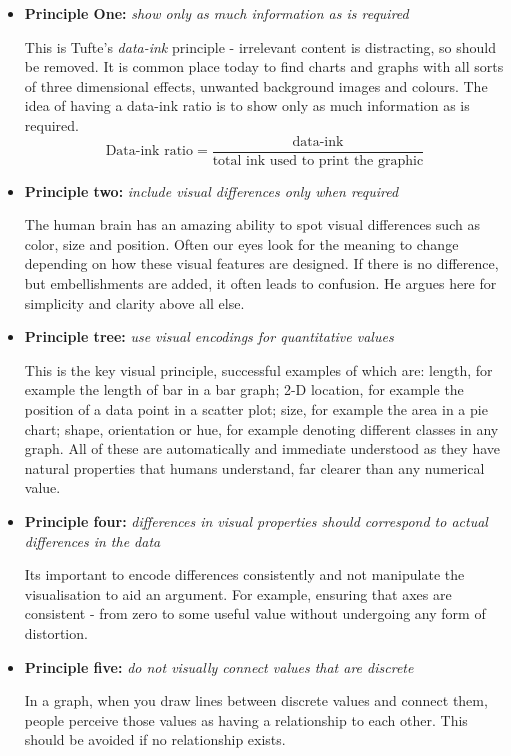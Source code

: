\documentclass[a4paper,11pt,titlepage]{article}
\begin{document}
		\par
	\begin{itemize}
		\item \textbf{Principle One:}
		\textit{show only as much information as is required}
		\par 
		This is Tufte's \textit{data-ink} principle - irrelevant content is distracting, so should be removed. It is common place today to find charts and graphs with all sorts of three dimensional effects, unwanted background images and colours. The idea of having a data-ink ratio is to show only as much information as is required.
		$$
		\text{Data-ink ratio} = 
		\frac{\text{data-ink}}{\text{total ink used to print the graphic}}
		$$

		\item \textbf{Principle two:}
		\textit{include visual differences only when required} 
		\par
		The human brain has an amazing ability to spot visual differences such as color, size and position. Often our eyes look for the meaning to change depending on how these visual features are designed. If there is no difference, but embellishments are added, it often leads to confusion. He argues here for simplicity and clarity above all else.

		\item \textbf{Principle tree:}
		\textit{use visual encodings for quantitative values}
		\par 
		This is the key visual principle, successful examples of which are: length, for example the length of bar in a bar graph; 2-D location, for example the position of a data point in a scatter plot; size, for example the area in a pie chart; shape, orientation or hue, for example denoting different classes in any graph. All of these are automatically and immediate understood as they have natural properties that humans understand, far clearer than any numerical value.

		\item \textbf{Principle four:}
		\textit{differences in visual properties should correspond to actual differences in the data}
		\par 
		Its important to encode differences consistently and not manipulate the visualisation to aid an argument. For example, ensuring that axes are consistent - from zero to some useful value without undergoing any form of distortion.

		\item \textbf{Principle five:}
		\textit{do not visually connect values that are discrete}
		\par 
		In a graph, when you draw lines between discrete values and connect them, people perceive those values as having a relationship to each other. This should be avoided if no relationship exists.


\end{itemize}
\end{document}
